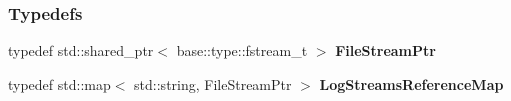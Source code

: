 \subsubsection*{Typedefs}
\begin{DoxyCompactItemize}
\item 
\hypertarget{a00184_a8b10bcfd674533f8340cd8c39fbf5233}{}typedef std\+::shared\+\_\+ptr$<$ base\+::type\+::fstream\+\_\+t $>$ {\bfseries File\+Stream\+Ptr}\label{a00184_a8b10bcfd674533f8340cd8c39fbf5233}

\item 
\hypertarget{a00184_af7602da9fe1d6c75985184fb0e39fd11}{}typedef std\+::map$<$ std\+::string, File\+Stream\+Ptr $>$ {\bfseries Log\+Streams\+Reference\+Map}\label{a00184_af7602da9fe1d6c75985184fb0e39fd11}

\end{DoxyCompactItemize}
